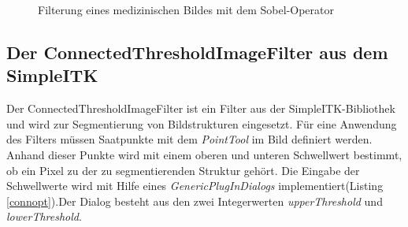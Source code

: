 \begin{figure}[htb]
\centering
{}
\caption{Filterung eines medizinischen Bildes mit dem Sobel-Operator}
\label{sobel_filter}
\end{figure}

\FloatBarrier
\subsection{Der ConnectedThresholdImageFilter aus dem SimpleITK}

Der ConnectedThresholdImageFilter ist ein Filter aus der SimpleITK-Bibliothek und wird zur Segmentierung von Bildstrukturen eingesetzt. Für eine Anwendung des Filters müssen Saatpunkte mit dem \textit{PointTool} im Bild definiert werden. Anhand dieser Punkte wird mit einem oberen und unteren Schwellwert bestimmt, ob ein Pixel zu der zu segmentierenden Struktur gehört. Die Eingabe der Schwellwerte wird mit Hilfe eines \textit{GenericPlugInDialogs} implementiert(Listing \ref{connopt}).Der Dialog besteht aus den zwei Integerwerten \textit{upperThreshold} und \textit{lowerThreshold}.

